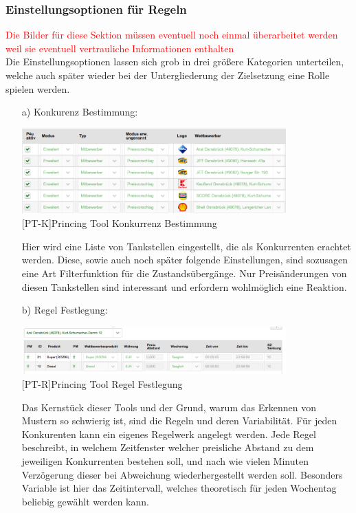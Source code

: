 \documentclass[12pt,a4paper,bibliography=totocnumbered,listof=totocnumbered]{scrartcl}
\begin{document}
\subsubsection{Einstellungsoptionen für Regeln}
\textcolor{red}{Die Bilder für diese Sektion müssen eventuell noch einmal überarbeitet werden weil sie eventuell vertrauliche Informationen enthalten}\\
Die Einstellungsoptionen lassen sich grob in drei größere Kategorien unterteilen, welche auch später wieder bei der Untergliederung der Zielsetzung eine Rolle spielen werden.
\begin{enumerate}
\item[a)] Konkurenz Bestimmung:\\ 

\begin{center}
	\includegraphics[width=0.8\textwidth, draft]{Bilder/konkurenz.png}\\
	[PT-K]{Princing Tool Konkurrenz Bestimmung}
	\label{fig:PT-K}
\end{center}
Hier wird eine Liste von Tankstellen eingestellt, die als Konkurrenten erachtet werden. Diese, sowie auch noch später folgende Einstellungen, sind sozusagen eine Art Filterfunktion für die Zustandsübergänge. Nur Preisänderungen von diesen Tankstellen sind interessant und erfordern wohlmöglich eine Reaktion.

\item[b)] Regel Festlegung:\\
\begin{center}
	\includegraphics[width=0.8\textwidth, draft]{Bilder/regeln1.png}\\
	[PT-R]{Princing Tool Regel Festlegung}
	\label{fig:PT-R}
\end{center}
Das Kernstück dieser Tools und der Grund, warum das Erkennen von Mustern so schwierig ist, sind die Regeln und deren Variabilität. Für jeden Konkurenten kann ein eigenes Regelwerk angelegt werden. Jede Regel beschreibt, in welchem Zeitfenster welcher preisliche Abstand zu dem jeweiligen Konkurrenten bestehen soll, und nach wie vielen Minuten Verzögerung dieser bei Abweichung wiederhergestellt werden soll. Besonders Variable ist hier das Zeitintervall, welches theoretisch für jeden Wochentag beliebig gewählt werden kann.


\end{enumerate}
\end{document}
